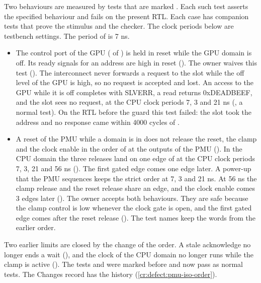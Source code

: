 Two behaviours are measured by tests that are marked . Each such test asserts the specified behaviour and fails on the present RTL. Each case has companion tests that prove the stimulus and the checker. The clock periods below are testbench settings. The period of  is 7 ns.
\begin{itemize}
  \item The control port of the GPU ( of ) is held in reset while the GPU domain is off. Its ready signals for an address are high in reset (). The owner waives this test (). The interconnect never forwards a request to the slot while the off level of the GPU is high, so no request is accepted and lost. An access to the GPU while it is off completes with SLVERR, a read returns 0xDEADBEEF, and the slot sees no request, at the CPU clock periods 7, 3 and 21 ns (, a normal test). On the RTL before the guard this test failed: the slot took the address and no response came within 4000 cycles of .
  \item A reset of the PMU while a domain is in  does not release the reset, the clamp and the clock enable in the order of  at the outputs of the PMU (). In the CPU domain the three releases land on one edge of  at the CPU clock periods 7, 3, 21 and 56 ns (). The first gated edge comes one edge later. A power-up that the PMU sequences keeps the strict order at 7, 3 and 21 ns. At 56 ns the clamp release and the reset release share an edge, and the clock enable comes 3 edges later (). The owner accepts both behaviours. They are safe because the clamp control is low whenever the clock gate is open, and the first gated edge comes after the reset release (). The test names keep the words  from the earlier order.
\end{itemize}

Two earlier limits are closed by the change of the order. A stale acknowledge no longer ends a wait (), and the clock of the CPU domain no longer runs while the clamp is active (). The tests  and  were marked  before and now pass as normal tests. The Changes record has the history (\cref{cr:defect:pmu-iso-order}).

